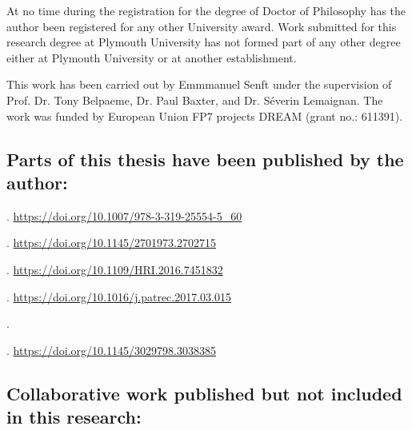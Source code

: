 At no time during the registration for the degree of Doctor of Philosophy has
the author been registered for any other University award. Work submitted for
this research degree at Plymouth University has not formed part of any other
degree either at Plymouth University or at another establishment.

This work has been carried out by Emmmanuel Senft under the supervision of Prof.
Dr. Tony Belpaeme, Dr. Paul Baxter, and Dr. S\'{e}verin Lemaignan. The work was
funded by European Union FP7 projects DREAM (grant no.: 611391).

\subsection*{Parts of this thesis have been published by the author:}



. \url{https://doi.org/10.1007/978-3-319-25554-5\_60}

. \url{https://doi.org/10.1145/2701973.2702715}

. \url{https://doi.org/10.1109/HRI.2016.7451832}


. \url{https://doi.org/10.1016/j.patrec.2017.03.015}

.

. \url{https://doi.org/10.1145/3029798.3038385}


\subsection*{Collaborative work published but not included in this research:}










